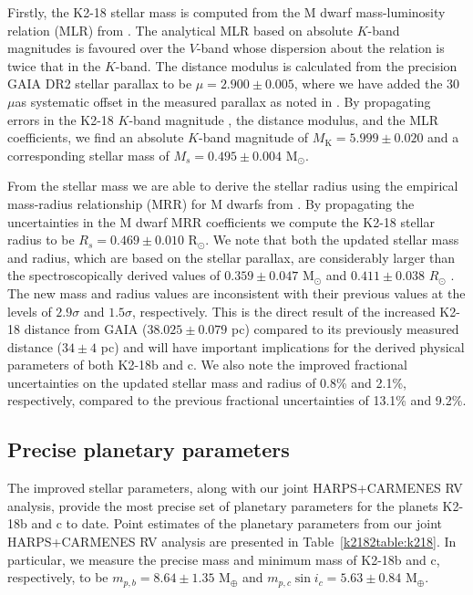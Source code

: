 Firstly, the K2-18 stellar mass is computed from the M dwarf mass-luminosity relation (MLR) from \cite{benedict16}.
The analytical MLR based on absolute $K$-band magnitudes is favoured over the $V$-band whose dispersion about the
relation is twice that in the $K$-band. The distance modulus is calculated from the precision GAIA DR2 stellar parallax
\citep[$p=26.299\pm 0.055$ mas;][]{gaia18} to be $\mu=2.900\pm 0.005$, where we have added the 30 $\mu$as systematic
offset in the measured parallax as noted in \cite{lindegren18}. By propagating errors
in the K2-18 $K$-band magnitude \citep[$K=8.899\pm 0.019$;][]{cutri03}, the distance modulus, and the MLR coefficients,
we find an absolute $K$-band
magnitude of $M_{\text{K}}=5.999\pm 0.020$ and a corresponding stellar mass of $M_s=0.495\pm 0.004$ M$_{\odot}$.

From the stellar mass we are able to derive the stellar radius using the empirical mass-radius relationship (MRR)
for M dwarfs from \cite{boyajian12}. By propagating the uncertainties in the M dwarf MRR
coefficients we compute the K2-18 stellar radius to be $R_s=0.469\pm 0.010$ R$_{\odot}$. We note that both the
updated stellar mass and radius, which are based on the stellar parallax, are considerably larger than the
spectroscopically derived values of $0.359\pm 0.047$ M$_{\odot}$ and $0.411\pm 0.038$ $R_{\odot}$
\citep{benneke17}. The new mass and radius values are inconsistent with their previous values at the levels of
$2.9\sigma$ and $1.5\sigma$, respectively. This is the direct result of the increased K2-18 distance from GAIA 
($38.025\pm 0.079$ pc) compared to its previously measured distance ($34\pm 4$ pc) and 
will have important implications for the derived physical parameters of
both K2-18b and c. We also note the improved fractional uncertainties on the updated stellar mass and radius
of 0.8\% and 2.1\%, respectively, compared to the previous fractional uncertainties of
13.1\% and 9.2\%.


\subsection{Precise planetary parameters}
The improved stellar parameters, along with our joint HARPS+CARMENES RV analysis, provide the most
precise set of planetary parameters for the planets K2-18b and c to date. Point estimates of the planetary
parameters from our joint HARPS+CARMENES RV analysis are presented in Table~\ref{k2182table:k218}. In
particular, we measure the precise mass and minimum mass of K2-18b and c, respectively, to be
$m_{p,b}=8.64\pm 1.35$ M$_{\oplus}$ and $m_{p,c}\sin{i_c}=5.63\pm 0.84$ M$_{\oplus}$.


